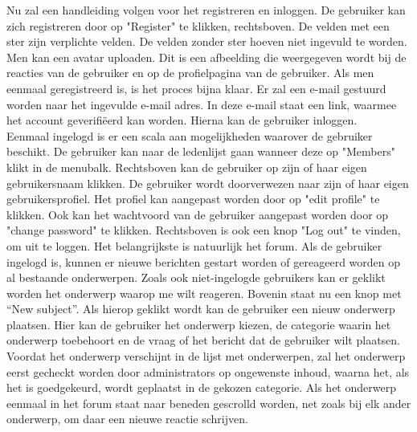 \documentclass[a4paper,12pt]{article}
\begin{document}
Nu zal een handleiding volgen voor het registreren en inloggen. De gebruiker kan zich registreren door op "Register" te klikken, rechtsboven. De velden met een ster zijn verplichte velden. De velden zonder ster hoeven niet ingevuld te worden. Men kan een avatar uploaden. Dit is een afbeelding die weergegeven wordt bij de reacties van de gebruiker en op de profielpagina van de gebruiker. Als men eenmaal geregistreerd is, is het proces bijna klaar. Er zal een e-mail gestuurd worden naar het ingevulde e-mail adres. In deze e-mail staat een link, waarmee het account geverifi\"eerd kan worden. Hierna kan de gebruiker inloggen. \\
Eenmaal ingelogd is er een scala aan mogelijkheden waarover de gebruiker beschikt. De gebruiker kan naar de ledenlijst gaan wanneer deze op "Members" klikt in de menubalk. Rechtsboven kan de gebruiker op zijn of haar eigen gebruikersnaam klikken. De gebruiker wordt doorverwezen naar zijn of haar eigen gebruikersprofiel. Het profiel kan aangepast worden door op "edit profile" te klikken. Ook kan het wachtvoord van de gebruiker aangepast worden door op "change password" te klikken. Rechtsboven is ook een knop "Log out" te vinden, om uit te loggen. Het belangrijkste is natuurlijk het forum. Als de gebruiker ingelogd is, kunnen er nieuwe berichten gestart worden of gereageerd worden op al bestaande onderwerpen. Zoals ook niet-ingelogde gebruikers kan er geklikt worden het onderwerp waarop me wilt reageren. Bovenin staat nu een knop met “New subject”. Als hierop geklikt wordt kan de gebruiker een nieuw onderwerp plaatsen. Hier kan de gebruiker het onderwerp kiezen, de categorie waarin het onderwerp toebehoort en de vraag of het bericht dat de gebruiker wilt plaatsen. Voordat het onderwerp verschijnt in de lijst met onderwerpen, zal het onderwerp eerst gecheckt worden door administrators op ongewenste inhoud, waarna het, als het is goedgekeurd, wordt geplaatst in de gekozen categorie. Als het onderwerp eenmaal in het forum staat naar beneden gescrolld worden, net zoals bij elk ander onderwerp, om daar een nieuwe reactie schrijven.
\end{document}
